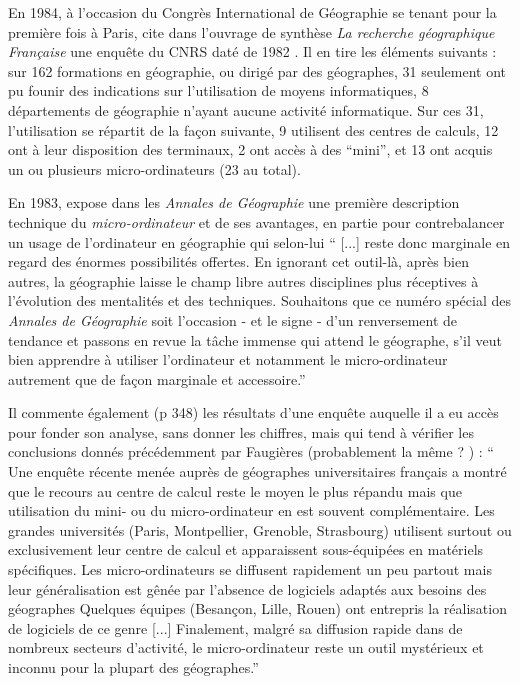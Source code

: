 
En 1984, à l'occasion du Congrès International de Géographie se tenant pour la première fois à Paris, \textcite{Faugieres1984} cite dans l'ouvrage de synthèse \textit{La recherche géographique Française} une enquête du CNRS daté de 1982 . Il en tire les éléments suivants : sur 162 formations en géographie, ou dirigé par des géographes, 31 seulement ont pu founir des indications sur l'utilisation de moyens informatiques, 8 départements de géographie n'ayant aucune activité informatique. Sur ces 31, l'utilisation se répartit de la façon suivante, 9 utilisent des centres de calculs, 12 ont à leur disposition des terminaux, 2 ont accès à des \enquote{mini}, et 13 ont acquis un ou plusieurs micro-ordinateurs (23 au total).

En 1983, \textcite[367]{Lecarpentier1983} expose dans les \textit{Annales de Géographie} une première description technique du \textit{micro-ordinateur} et de ses avantages, en partie pour contrebalancer un usage de l'ordinateur en géographie qui selon-lui \enquote{ [...] reste donc marginale en regard des énormes possibilités offertes. En ignorant cet outil-là, après bien autres, la géographie laisse le champ libre autres disciplines plus réceptives à l'évolution des mentalités et des techniques. Souhaitons que ce numéro spécial des \textit{Annales de Géographie} soit l'occasion - et le signe - d'un renversement de tendance et passons en revue la tâche immense qui attend le géographe, s'il veut bien apprendre à utiliser l'ordinateur et notamment le micro-ordinateur autrement que de façon marginale et accessoire.}

Il commente également (p 348) les résultats d'une enquête auquelle il a eu accès pour fonder son analyse, sans donner les chiffres, mais qui tend à vérifier les conclusions donnés précédemment par Faugières (probablement la même ?  ) : \enquote{ Une enquête récente menée auprès de géographes universitaires français a montré que le recours au centre de calcul reste le moyen le plus répandu mais que utilisation du mini- ou du micro-ordinateur en est souvent complémentaire. Les grandes universités (Paris, Montpellier,  Grenoble, Strasbourg) utilisent surtout ou exclusivement leur centre de calcul et apparaissent sous-équipées en matériels spécifiques. Les micro-ordinateurs se diffusent rapidement un peu partout mais leur généralisation est gênée par l'absence de logiciels adaptés aux besoins des géographes Quelques équipes (Besançon, Lille, Rouen) ont entrepris la réalisation de logiciels de ce genre [...] Finalement, malgré sa diffusion rapide dans de nombreux secteurs d'activité, le micro-ordinateur reste un outil mystérieux et inconnu pour la plupart des géographes.}

